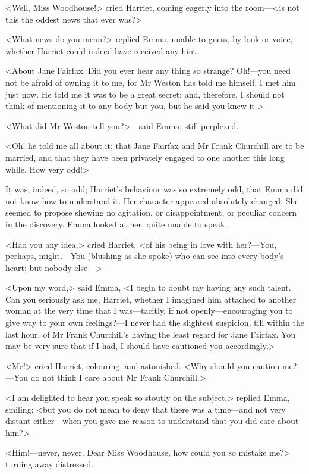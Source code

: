 <Well, Miss Woodhouse!> cried Harriet, coming eagerly into the room—<is not this the oddest news that ever was?>

<What news do you mean?> replied Emma, unable to guess, by look or voice, whether Harriet could indeed have received any hint.

<About Jane Fairfax. Did you ever hear any thing so strange? Oh!—you need not be afraid of owning it to me, for Mr Weston has told me himself. I met him just now. He told me it was to be a great secret; and, therefore, I should not think of mentioning it to any body but you, but he said you knew it.>

<What did Mr Weston tell you?>—said Emma, still perplexed.

<Oh! he told me all about it; that Jane Fairfax and Mr Frank Churchill are to be married, and that they have been privately engaged to one another this long while. How very odd!>

It was, indeed, so odd; Harriet's behaviour was so extremely odd, that Emma did not know how to understand it. Her character appeared absolutely changed. She seemed to propose shewing no agitation, or disappointment, or peculiar concern in the discovery. Emma looked at her, quite unable to speak.

<Had you any idea,> cried Harriet, <of his being in love with her?—You, perhaps, might.—You (blushing as she spoke) who can see into every body's heart; but nobody else—>

<Upon my word,> said Emma, <I begin to doubt my having any such talent. Can you seriously ask me, Harriet, whether I imagined him attached to another woman at the very time that I was—tacitly, if not openly—encouraging you to give way to your own feelings?—I never had the slightest suspicion, till within the last hour, of Mr Frank Churchill's having the least regard for Jane Fairfax. You may be very sure that if I had, I should have cautioned you accordingly.>

<Me!> cried Harriet, colouring, and astonished. <Why should you caution me?—You do not think I care about Mr Frank Churchill.>

<I am delighted to hear you speak so stoutly on the subject,> replied Emma, smiling; <but you do not mean to deny that there was a time—and not very distant either—when you gave me reason to understand that you did care about him?>

<Him!—never, never. Dear Miss Woodhouse, how could you so mistake me?> turning away distressed.

